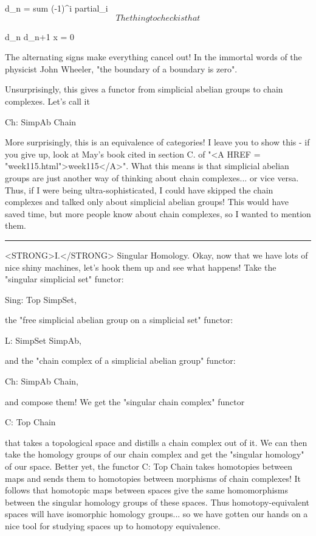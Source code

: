                 d_{n} = sum (-1)^{i} partial_{i} 
$$
    
The thing to check is that 

$$

                     d_{n} d_{n+1} x = 0 
$$
    
The alternating signs make everything cancel out!  In the immortal words
of the physicist John Wheeler, "the boundary of a boundary is zero".  

Unsurprisingly, this gives a functor from simplicial abelian groups
to chain complexes.  Let's call it

                Ch: SimpAb \to  Chain

More surprisingly, this is an equivalence of categories!  I leave you to
show this - if you give up, look at May's book cited in section C. of
"<A HREF = "week115.html">week115</A>".  What this means is that simplicial abelian groups are just
another way of thinking about chain complexes...  or vice versa.  Thus,
if I were being ultra-sophisticated, I could have skipped the chain
complexes and talked only about simplicial abelian groups!  This would
have saved time, but more people know about chain complexes, so I wanted
to mention them.

\par\noindent\rule{\textwidth}{0.4pt}
<STRONG>I.</STRONG>  Singular Homology.  Okay, now that we have lots of nice shiny
machines, let's hook them up and see what happens!  Take the "singular
simplicial set" functor:

                   Sing: Top \to  SimpSet, 

the "free simplicial abelian group on a simplicial set" functor:

                   L: SimpSet \to  SimpAb,

and the "chain complex of a simplicial abelian group" functor:

                   Ch: SimpAb \to  Chain,

and compose them!  We get the "singular chain complex" functor

                   C: Top \to  Chain

that takes a topological space and distills a chain complex out of it.
We can then take the homology groups of our chain complex and get the
"singular homology" of our space.  Better yet, the functor C: Top \to 
Chain takes homotopies between maps and sends them to homotopies between
morphisms of chain complexes!  It follows that homotopic maps between
spaces give the same homomorphisms between the singular homology groups
of these spaces.  Thus homotopy-equivalent spaces will have isomorphic
homology groups... so we have gotten our hands on a nice tool for
studying spaces up to homotopy equivalence.

